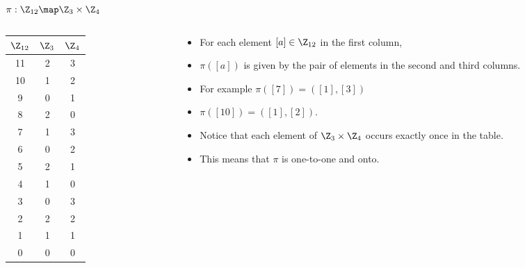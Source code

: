 \documentclass[handout]{beamer}
\begin{document}
\begin{frame}{$\pi:\Z_{12} \map \Z_3\times \Z_4$}

\begin{columns}
\begin{column}{0.33\textwidth}

\begin{tabular}{|c||c|c|}\hline
$\Z_{12}$   &  $\Z_3$ & $\Z_4$ \\ \hline\hline
11          &   2     &  3     \\ \hline
10          &   1     &  2     \\ \hline
9           &   0     &  1     \\ \hline
8           &   2     &  0     \\ \hline
7           &   1     &  3     \\ \hline
6           &   0     &  2     \\ \hline
5           &   2     &  1     \\ \hline
4           &   1     &  0     \\ \hline
3           &   0     &  3     \\ \hline
2           &   2     &  2     \\ \hline
1           &   1     &  1     \\ \hline
0           &   0     &  0     \\ \hline
\end{tabular}

\end{column}

\begin{column}{0.67\textwidth}

\begin{itemize}
  \item For each element $[a]\in\Z_{12}$ in the first column,
  \item $\pi([a])$ is given by the pair of elements in the second and third columns.
  \item For example $\pi([7]) = \left([1], [3] \right)$
  \item $\pi([10]) = \left([1],[2]\right)$.
  \item Notice that each element of $\Z_3\times \Z_4$ occurs exactly once in the table.
  \item This means that $\pi$ is one-to-one and onto.
\end{itemize}

\end{column}
\end{columns}

\end{frame}
\end{document}
